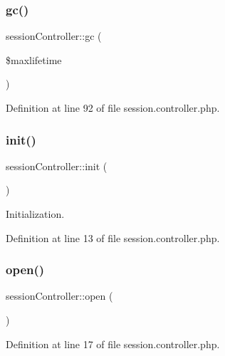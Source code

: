 \hypertarget{classsessionController_a38ec9eb8d466cbf0191b35f69cd2f960}{}\label{classsessionController_a38ec9eb8d466cbf0191b35f69cd2f960} 
\subsubsection{\texorpdfstring{gc()}{gc()}}
{\footnotesize\ttfamily session\+Controller\+::gc (\begin{DoxyParamCaption}\item[{}]{\$maxlifetime }\end{DoxyParamCaption})}



Definition at line 92 of file session.\+controller.\+php.

\hypertarget{classsessionController_a36dc0e81503442a6f77d7d96ab7b5eba}{}\label{classsessionController_a36dc0e81503442a6f77d7d96ab7b5eba} 
\subsubsection{\texorpdfstring{init()}{init()}}
{\footnotesize\ttfamily session\+Controller\+::init (\begin{DoxyParamCaption}{ }\end{DoxyParamCaption})}



Initialization. 



Definition at line 13 of file session.\+controller.\+php.

\hypertarget{classsessionController_a6d695e575646db3c90300eb6da7eb69d}{}\label{classsessionController_a6d695e575646db3c90300eb6da7eb69d} 
\subsubsection{\texorpdfstring{open()}{open()}}
{\footnotesize\ttfamily session\+Controller\+::open (\begin{DoxyParamCaption}{ }\end{DoxyParamCaption})}



Definition at line 17 of file session.\+controller.\+php.

